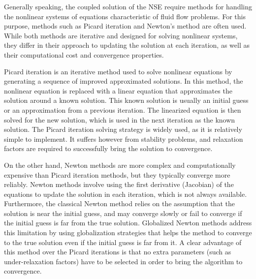 Generally speaking, the coupled solution of the \Gls{NSE} require methods for handling the nonlinear systems of equations characteristic of fluid flow problems. For this purpose, methods such as Picard iteration and Newton's method are often used. While both methods are iterative and designed for solving nonlinear systems, they differ in their approach to updating the solution at each iteration, as well as their computational cost and convergence properties.

Picard iteration is an iterative method used to solve nonlinear equations by generating a sequence of improved approximated solutions. In this method, the nonlinear equation is replaced with a linear equation that approximates the solution around a known solution. This known solution is usually an initial guess or an approximation from a previous iteration. The linearized equation is then solved for the new solution, which is used in the next iteration as the known solution. The Picard iteration solving strategy is widely used, as it is relatively simple to implement. It suffers however from stability problems, and relaxation factors are required to successfully bring the solution to convergence. 

On the other hand, Newton methods are more complex and computationally expensive than Picard iteration methods, but they typically converge more reliably. Newton methods involve using the first derivative (Jacobian) of the equations to update the solution in each iteration, which is not always available. Furthermore, the classical Newton method relies on the assumption that the solution is near the initial guess, and may converge slowly or fail to converge if the initial guess is far from the true solution. Globalized Newton methods address this limitation by using globalization strategies that helps the method to converge to the true solution even if the initial guess is far from it. A clear advantage of this method over the Picard iterations is that no extra parameters (such as under-relaxation factors) have to be selected in order to bring the algorithm to convergence. 
 
